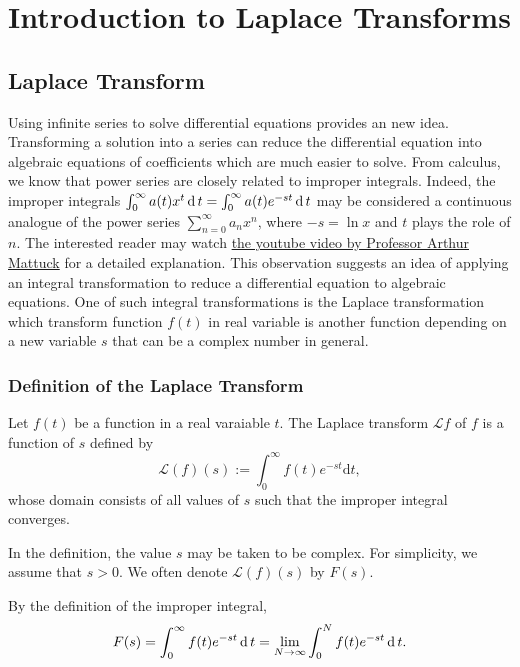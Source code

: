 \chapter{Introduction to Laplace Transforms}

\section{Laplace Transform}

Using infinite series to solve differential equations provides an new idea. Transforming a solution into a series can reduce the differential equation into algebraic equations of coefficients which are much easier to solve. From calculus, we know that power series are closely related to improper integrals. Indeed, the improper integrals $\int_0^\infty a(t)x^t\operatorname{d} t=\int_0^\infty a(t)e^{-st}\operatorname{d} t$ may be considered a continuous analogue of the power series $\sum\limits_{n=0}^\infty a_nx^n$, where $-s=\ln x$ and $t$ plays the role of $n$. The interested reader may watch \href{https://www.youtube.com/watch?v=sZ2qulI6GEk}{the youtube video by Professor Arthur Mattuck} for a detailed explanation. This observation suggests an idea of applying an integral transformation to reduce a differential equation to algebraic equations. One of such integral transformations is the Laplace transformation which transform function $f(t)$ in real variable is another 
function depending on a new variable $s$ that can be a complex number in general. 

\subsection*{Definition of the Laplace Transform}

\begin{definition}
Let $f(t)$ be a function in a real varaiable $t$. The Laplace transform $\mathcal{L}f$ of $f$ is a function of $s$ defined by
\[\mathcal{L}(f)(s):=\int_0^\infty f(t)e^{-st}\mathrm{d} t,\]
whose domain consists of all values of $s$ such that the improper integral converges.
\end{definition}

In the definition, the value $s$ may be taken to be complex. For simplicity, we assume that $s>0$. We often denote $\mathcal{L}(f)(s)$ by $F(s)$.

By the definition of the improper integral,
\[F(s)=\int_0^\infty f(t)e^{-st}\operatorname{d} t=\lim\limits_{N\to \infty}\int_0^N f(t)e^{-st}\operatorname{d} t.\]

